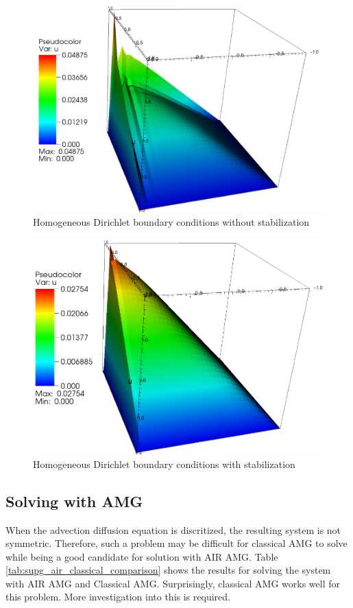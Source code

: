 \documentclass[11pt]{article}
\begin{document}
\begin{figure}[ht]
	\centering
	\includegraphics[scale=0.3]{./figures/no_supg_dir.png}
	\caption{Homogeneous Dirichlet boundary conditions without stabilization}
	\label{fig:no_supg_dir}
\end{figure}

\begin{figure}[ht]
	\centering
	\includegraphics[scale=0.3]{./figures/supg_dir.png}
	\caption{Homogeneous Dirichlet boundary conditions with stabilization}
	\label{fig:supg_dir}
\end{figure}

\FloatBarrier
\subsection{Solving with AMG}
When the advection diffusion equation is discritized, the resulting system is not symmetric. Therefore, such a problem may be difficult for classical AMG to solve while being a good candidate for solution with AIR AMG. Table \ref{tab:supg_air_classical_comparison} shows the results for solving the system with AIR AMG and Classical AMG. Surprisingly, classical AMG works well for this problem. More investigation into this is required.
\end{document}
